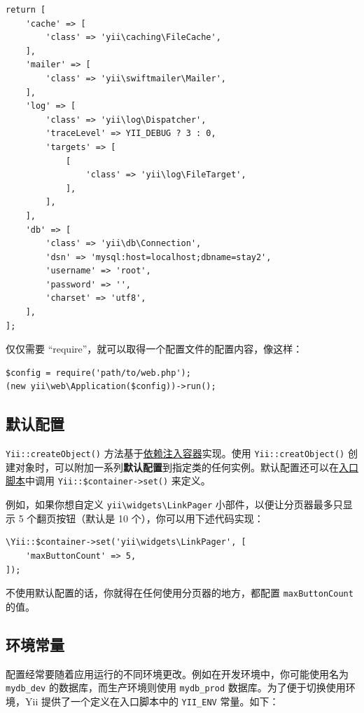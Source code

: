 \lstset{language=php}\begin{lstlisting}
return [
    'cache' => [
        'class' => 'yii\caching\FileCache',
    ],
    'mailer' => [
        'class' => 'yii\swiftmailer\Mailer',
    ],
    'log' => [
        'class' => 'yii\log\Dispatcher',
        'traceLevel' => YII_DEBUG ? 3 : 0,
        'targets' => [
            [
                'class' => 'yii\log\FileTarget',
            ],
        ],
    ],
    'db' => [
        'class' => 'yii\db\Connection',
        'dsn' => 'mysql:host=localhost;dbname=stay2',
        'username' => 'root',
        'password' => '',
        'charset' => 'utf8',
    ],
];
\end{lstlisting}
仅仅需要 “require”，就可以取得一个配置文件的配置内容，像这样：

\lstset{language=php}\begin{lstlisting}
$config = require('path/to/web.php');
(new yii\web\Application($config))->run();
\end{lstlisting}
\subsection{默认配置 \label{concept-configurations.md::default-configurations}}
\texttt{Yii\allowbreak{}::\allowbreak{}createObject()} 方法基于\hyperref[concept-di-container.md]{依赖注入容器}实现。使用 \texttt{Yii\allowbreak{}::\allowbreak{}creatObject()} 创建对象时，可以附加一系列\textbf{默认配置}到指定类的任何实例。默认配置还可以在\hyperref[runtime-bootstrapping.md]{入口脚本}中调用 \lstinline|Yii::$container->set()| 来定义。

例如，如果你想自定义 \texttt{yii{\allowbreak{}\textbackslash}widgets{\allowbreak{}\textbackslash}LinkPager} 小部件，以便让分页器最多只显示 5 个翻页按钮（默认是 10 个），你可以用下述代码实现：

\lstset{language=php}\begin{lstlisting}
\Yii::$container->set('yii\widgets\LinkPager', [
    'maxButtonCount' => 5,
]);
\end{lstlisting}
不使用默认配置的话，你就得在任何使用分页器的地方，都配置 \lstinline|maxButtonCount| 的值。

\subsection{环境常量 \label{concept-configurations.md::environment-constants}}
配置经常要随着应用运行的不同环境更改。例如在开发环境中，你可能使用名为 \lstinline|mydb_dev| 的数据库，而生产环境则使用 \lstinline|mydb_prod| 数据库。为了便于切换使用环境，Yii 提供了一个定义在入口脚本中的 \lstinline|YII_ENV| 常量。如下：

